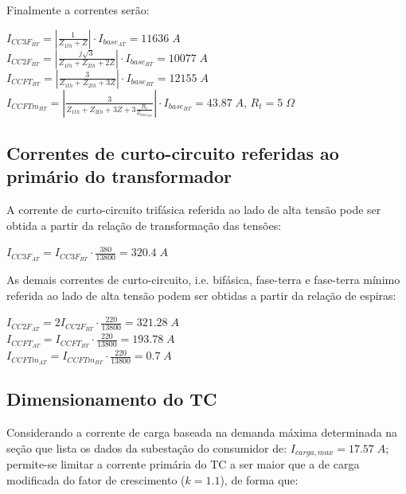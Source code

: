 Finalmente a correntes serão:

\begin{flushleft}
$I_{CC3F_{BT}} = \left|\frac{1}{Z_{1th}+Z}\right| \cdot I_{base_{AT}} = 11636 \; A$ \\
$I_{CC2F_{BT}} = \left|\frac{j\sqrt{3}}{Z_{1th}+Z_{2th}+2Z}\right| \cdot I_{base_{BT}} = 10077 \; A$ \\
$I_{CCFT_{BT}} = \left|\frac{3}{Z_{1th}+Z_{2th}+3Z}\right| \cdot I_{base_{BT}} = 12155 \; A$ \\
$I_{CCFTm_{BT}} = \left|\frac{3}{Z_{1th}+Z_{2th}+3Z+3\frac{R_t}{Z_{base_{BT}}}}\right| \cdot I_{base_{BT}} = 43.87 \; A$, $R_t = 5 \; \Omega$ 
\end{flushleft}

\subsection{Correntes de curto-circuito referidas ao primário do transformador}

A corrente de curto-circuito trifásica referida ao lado de alta tensão pode ser obtida a partir da relação de transformação das tensões:

\begin{flushleft}
$I_{CC3F_{AT}} = I_{CC3F_{BT}} \cdot \frac{380}{13800} = 320.4 \; A$ 
\end{flushleft}

As demais correntes de curto-circuito, i.e. bifásica, fase-terra e fase-terra mínimo referida ao lado de alta tensão podem ser obtidas a partir da relação de espiras:

\begin{flushleft}
$I_{CC2F_{AT}} = 2I_{CC2F_{BT}} \cdot \frac{220}{13800} = 321.28\; A$  \\ \vspace{5pt}
$I_{CCFT_{AT}} = I_{CCFT_{BT}} \cdot \frac{220}{13800} = 193.78 \; A$  \\ \vspace{5pt}
$I_{CCFTm_{AT}} = I_{CCFTm_{BT}} \cdot \frac{220}{13800} = 0.7 \; A$  \\
\end{flushleft}

\subsection{Dimensionamento do TC}

Considerando a corrente de carga baseada na demanda máxima determinada na seção que lista os dados da subestação do consumidor de: $I_{carga,max} = 17.57 \; A$; permite-se limitar a corrente primária do TC a ser maior que a de carga modificada do fator de crescimento ($k = 1.1$), de forma que:

